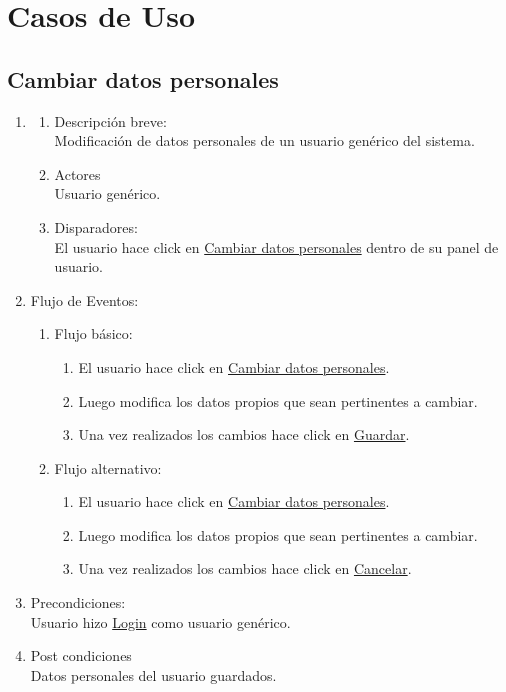 \documentclass[a4paper,11pt]{article}
\begin{document}
\pagebreak

\section{Casos de Uso}

\subsection{Cambiar datos personales}
\begin{enumerate}

    \item
    \begin{enumerate}
    \item Descripción breve: \\
        Modificación de datos personales de un usuario genérico del sistema.
    \item Actores \\
        Usuario genérico.
    \item Disparadores: \\
        El usuario hace click en \underline{Cambiar datos personales}
        dentro de su panel de usuario.
    \end{enumerate}

    \item Flujo de Eventos:
    \begin{enumerate}

        \item Flujo básico:
            \begin{enumerate}
                \item El usuario hace click en \underline{Cambiar datos personales}.
                \item Luego modifica los datos propios que sean pertinentes a cambiar.
                \item Una vez realizados los cambios hace click en \underline{Guardar}.
            \end{enumerate}
        \item Flujo alternativo:
            \begin{enumerate}
                \item El usuario hace click en \underline{Cambiar datos personales}.
                \item Luego modifica los datos propios que sean pertinentes a cambiar.
                \item Una vez realizados los cambios hace click en \underline{Cancelar}.
            \end{enumerate}
    \end{enumerate}

    \item Precondiciones: \\
        Usuario hizo \underline{Login} como usuario genérico.

    \item Post condiciones \\
        Datos personales del usuario guardados.

\end{enumerate}
\end{document}
